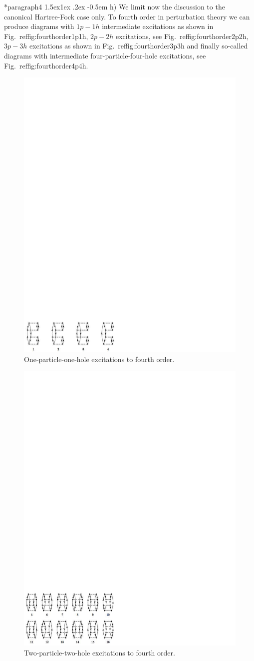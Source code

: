 \documentclass[%
twoside,                 %
final,                   %
10pt]{article}
\makeatletter
\newenvironment{doconceexercise}{}{}
\newcommand\subex{\@startsection*{paragraph}{4}{\z@}%
                  {1.5ex\@plus1ex \@minus.2ex}%
                  {-0.5em}%
                  {\normalfont\normalsize\bfseries}}
\makeatother
\begin{document}
\begin{doconceexercise}
\subex{h)}
We limit now the discussion to the canonical Hartree-Fock case only. To fourth order in perturbation theory we can produce diagrams with $1p-1h$ intermediate excitations as shown in Fig.~ref{fig:fourthorder1p1h}, $2p-2h$ excitations, see Fig.~ref{fig:fourthorder2p2h}, $3p-3h$ excitations as shown in Fig.~ref{fig:fourthorder3p3h} and finally so-called diagrams with intermediate four-particle-four-hole excitations, see Fig.~ref{fig:fourthorder4p4h}. 


\begin{figure}[t]
  \centerline{\includegraphics[width=0.6\linewidth]{fig-proj/1p1h.pdf}}
  \caption{
  One-particle-one-hole excitations to fourth order. \label{fig:fourthorder1p1h}
  }
\end{figure}



\begin{figure}[t]
  \centerline{\includegraphics[width=0.6\linewidth]{fig-proj/2p2h.pdf}}
  \caption{
  Two-particle-two-hole excitations to fourth order. \label{fig:fourthorder2p2h}
  }
\end{figure}




\end{doconceexercise}
\end{document}
